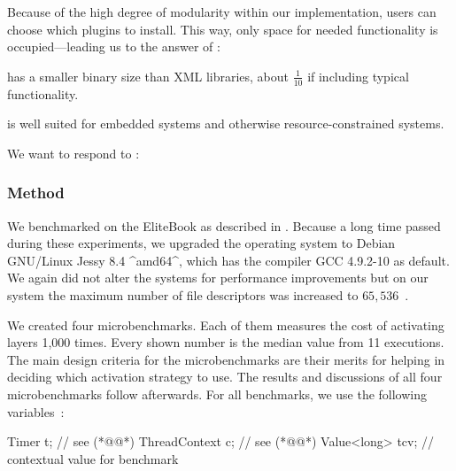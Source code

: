 Because of the high degree of modularity within our implementation, users can choose which plugins to install.
This way, only space for needed functionality is occupied---leading us to the answer of :
\rqEvaluationFrontendRessourceUtilization*

\begin{finding}
\elektra{} has a smaller binary size than XML libraries, about $\frac{1}{10}$ if including typical functionality.

\begin{implication}
\elektra{} is well suited for embedded systems and otherwise resource-constrained systems.
\end{implication}
\end{finding}





We want to respond to :
\rqEvaluationFrontendComparison*

\subsubsection{Method}


We benchmarked \elektra{} on the EliteBook as described in .
Because a long time passed during these experiments, we upgraded the operating system to Debian GNU/Linux Jessy 8.4 ^amd64^, which has the compiler GCC \mbox{4.9.2-10} as default.
We again did not alter the systems for performance improvements but on our system the maximum number of file descriptors was increased to $65,536$~\cite{raab2016persistent}.

We created four microbenchmarks.
Each of them measures the cost of activating layers 1,000 times.
Every shown number is the median value from 11 executions.
The main design criteria for the microbenchmarks are their merits for helping in deciding which activation strategy to use.
The results and discussions of all four microbenchmarks follow afterwards.
For all benchmarks, we use the following variables~\cite{raab2016persistent}:

\begin{code}[language=Cpp,escapeinside={(*@}{@*)}]
Timer t;           // see  (*@\color{purple}@*)
ThreadContext c;   // see  (*@\color{purple}@*)
Value<long> tcv;   // contextual value for benchmark
\end{code}


